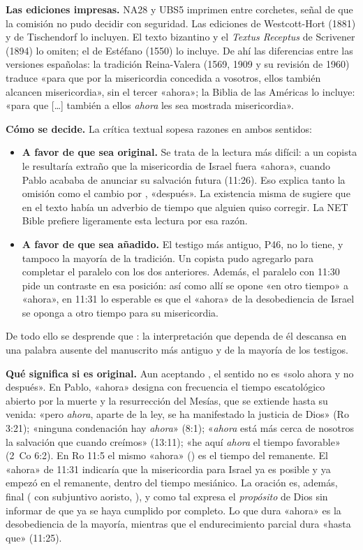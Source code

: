 \textbf{Las ediciones impresas.} NA28 y UBS5 imprimen \grc{[νῦν]} entre corchetes, señal de que la comisión no pudo decidir con seguridad. Las ediciones de Westcott-Hort (1881) y de Tischendorf lo incluyen. El texto bizantino y el \emph{Textus Receptus} de Scrivener (1894) lo omiten; el de Estéfano (1550) lo incluye. De ahí las diferencias entre las versiones españolas: la tradición Reina-Valera (1569, 1909 y su revisión de 1960) traduce «para que por la misericordia concedida a vosotros, ellos también alcancen misericordia», sin el tercer «ahora»; la Biblia de las Américas lo incluye: «para que [\ldots] también a ellos \emph{ahora} les sea mostrada misericordia».

\textbf{Cómo se decide.} La crítica textual sopesa razones en ambos sentidos:
\begin{itemize}
\item \textbf{A favor de que  sea original.} Se trata de la lectura más difícil: a un copista le resultaría extraño que la misericordia de Israel fuera «ahora», cuando Pablo acababa de anunciar su salvación futura (11:26). Eso explica tanto la omisión como el cambio por , «después». La existencia misma de  sugiere que en el texto había un adverbio de tiempo que alguien quiso corregir. La NET Bible prefiere ligeramente esta lectura por esa razón.
\item \textbf{A favor de que  sea añadido.} El testigo más antiguo, P46, no lo tiene, y tampoco la mayoría de la tradición. Un copista pudo agregarlo para completar el paralelo con los dos  anteriores. Además, el paralelo con 11:30 pide un contraste en esa posición: así como allí se opone «en otro tiempo» a «ahora», en 11:31 lo esperable es que el «ahora» de la desobediencia de Israel se oponga a otro tiempo para su misericordia.
\end{itemize}
De todo ello se desprende que : la interpretación que dependa de él descansa en una palabra ausente del manuscrito más antiguo y de la mayoría de los testigos.

\textbf{Qué significa si es original.} Aun aceptando , el sentido no es «solo ahora y no después». En Pablo, «ahora» designa con frecuencia el tiempo escatológico abierto por la muerte y la resurrección del Mesías, que se extiende hasta su venida: «pero \emph{ahora}, aparte de la ley, se ha manifestado la justicia de Dios» (Ro 3:21); «ninguna condenación hay \emph{ahora}» (8:1); «\emph{ahora} está más cerca de nosotros la salvación que cuando creímos» (13:11); «he aquí \emph{ahora} el tiempo favorable» (2~Co 6:2). En Ro 11:5 el mismo «ahora» () es el tiempo del remanente. El «ahora» de 11:31 indicaría que la misericordia para Israel ya es posible y ya empezó en el remanente, dentro del tiempo mesiánico. La oración es, además, final ( con subjuntivo aoristo, ), y como tal expresa el \emph{propósito} de Dios sin informar de que ya se haya cumplido por completo. Lo que dura «ahora» es la desobediencia de la mayoría, mientras que el endurecimiento parcial dura «hasta que» (11:25).

